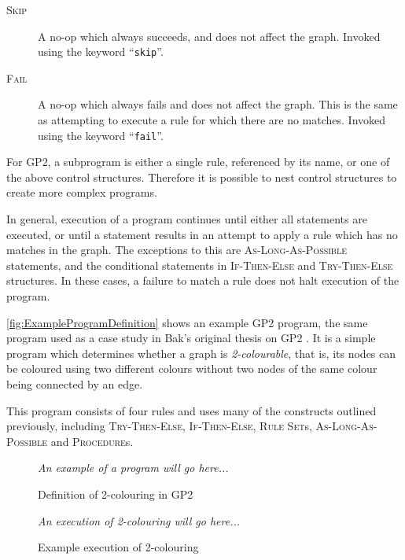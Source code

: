 \documentclass[authoryearcitations]{UoYCSproject}
\begin{document}
\begin{description}
    \item[\textsc{Skip}]
    A no-op which always succeeds, and does not affect the graph. Invoked using the
    keyword ``\texttt{skip}''.

    \item[\textsc{Fail}]
    A no-op which always fails and does not affect the graph. This is the same as
    attempting to execute a rule for which there are no matches. Invoked using
    the keyword ``\texttt{fail}''.
\end{description}

For GP2, a subprogram is either a single rule, referenced by its name, or one of
the above control structures. Therefore it is possible to nest control structures
to create more complex programs.

In general, execution of a program continues until either all statements are
executed, or until a statement results in an attempt to apply a rule which has
no matches in the graph. The exceptions to this are \textsc{As-Long-As-Possible}
statements, and the conditional statements in \textsc{If-Then-Else} and
\textsc{Try-Then-Else} structures. In these cases, a failure to match a rule
does not halt execution of the program.

\autoref{fig:ExampleProgramDefinition} shows an example GP2 program, the same
program used as a case study in Bak's original thesis on GP2
\citep[pp.126]{bak2015}. It is a simple program which determines whether a graph
is \emph{2-colourable}, that is, its nodes can be coloured using two different
colours without two nodes of the same colour being connected by an edge.

This program consists of four rules and uses many of the constructs outlined
previously, including \textsc{Try-Then-Else}, \textsc{If-Then-Else},
\textsc{Rule Set}s, \textsc{As-Long-As-Possible} and \textsc{Procedure}s.

\begin{figure}
    \begin{center}
        \emph{An example of a program will go here...}
    \end{center}
    \caption{Definition of 2-colouring in GP2}
    \label{fig:ExampleProgramDefinition}
\end{figure}

\begin{figure}
    \begin{center}
        \emph{An execution of 2-colouring will go here...}
    \end{center}
    \caption{Example execution of 2-colouring}
    \label{fig:ExampleProgramExecution}
\end{figure}
\end{document}
